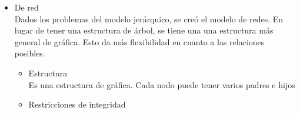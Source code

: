 \documentclass{article}
\begin{document}
\begin{enumerate}[label=\alph*.]
{\begin{itemize}
{                operativo.
                \begin{itemize}
                    \item {Estructura \\
                    En general, es un árbol. La estructura de los subárbles no 
                    está limitada.
                    }
                    \item {Restricciones de integridad \\
                    Cada nodo tiene un sol dato. Se pueden definir los tipos de 
                    nodos posibles, cada nodo con atributos que a su vez son nodos.\\
                    Puede o no haber restricciones de unicidad, pero como para 
                    acceder a un dato hay que recorrer el árbol, esto puede ser 
                    difícil de mantener. \\
                    Tampoco hay restricciones de integridad, pues no es posible 
                    definir llaves foráneas al sólo poder tener un sólo padre. 
                    }
                    \item {
                    Operaciones \\
                    Las mismas operaciones que en un árbol. Notemos que como hay
                    padre únicos, no se pueden modelar de forma sencilla relaciones
                    de muchos a muchos. Además, para mantener el árbol, insertar 
                    un dato puede cambiar radicalmente toda la estructura, y para
                    realizar consultas hay que realizar recorridos por el árbol.
                    }
                \end{itemize}
                }
                \item {
                De red \\
                Dados los problemas del modelo jerárquico, se creó el modelo de 
                redes. En lugar de tener una estructura de árbol, se tiene una 
                una estructura más general de gráfica. Esto da más flexibilidad 
                en cuanto a las relaciones posibles.
                \begin{itemize}
                    \item {Estructura \\
                    Es una estructura de gráfica. Cada nodo puede tener varios 
                    padres e hijos}
                    \item {Restricciones de integridad \\
}
\end{itemize}}
\end{itemize}}
\end{enumerate}
\end{document}

